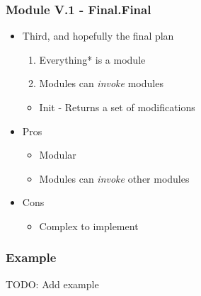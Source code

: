 \showlogo
\begin{frame}
  \frametitle{Module V.1 - Final.Final}
  \begin{itemize}
    \item Third, and hopefully the final plan
      \pause
      \begin{enumerate}
        \item Everything* is a module
          \pause
        \item Modules can \textit{invoke} modules
          \pause
      \end{enumerate}
      \begin{itemize}
        \item Init - Returns a set of modifications
      \end{itemize}
      \pause
    \item Pros
      \pause
      \begin{itemize}
        \item Modular
          \pause
        \item Modules can \textit{invoke} other modules
      \end{itemize}
      \pause
    \item Cons
      \begin{itemize}
          \pause
        \item Complex to implement
      \end{itemize}
  \end{itemize}
\end{frame}

\begin{frame}
  \frametitle{Example}
  TODO: Add example
\end{frame}

